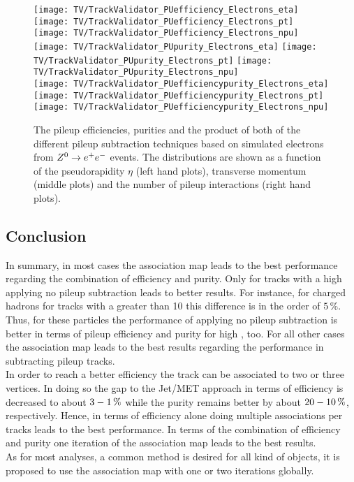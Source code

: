 \begin{figure}[Ht]
    \centering
    \texttt{[image: TV/TrackValidator\_PUefficiency\_Electrons\_eta]}
    \texttt{[image: TV/TrackValidator\_PUefficiency\_Electrons\_pt]}
    \texttt{[image: TV/TrackValidator\_PUefficiency\_Electrons\_npu]}
    \\
    \texttt{[image: TV/TrackValidator\_PUpurity\_Electrons\_eta]}
    \texttt{[image: TV/TrackValidator\_PUpurity\_Electrons\_pt]}
    \texttt{[image: TV/TrackValidator\_PUpurity\_Electrons\_npu]}
    \\
    \texttt{[image: TV/TrackValidator\_PUefficiencypurity\_Electrons\_eta]}
    \texttt{[image: TV/TrackValidator\_PUefficiencypurity\_Electrons\_pt]}
    \texttt{[image: TV/TrackValidator\_PUefficiencypurity\_Electrons\_npu]}
    \caption[Pileup efficiencies, purities and their product of the different pileup subtraction techniques based on simulated electrons from $\Zz\rightarrow\EE$ events]{The pileup efficiencies, purities and the product of both of the different pileup subtraction techniques based on simulated electrons from $\Zz\rightarrow\EE$ events. The distributions are shown as a function of the pseudorapidity $\eta$ (left hand plots), transverse momentum (middle plots) and the number of pileup interactions (right hand plots). \label{plot:TACOAElPileup}}
\end{figure}



\subsection{Conclusion \label{sec:TASEFRDAC}}

In summary, in most cases the association map leads to the best performance regarding the combination of efficiency and purity. Only for tracks with a high \pt{} applying no pileup subtraction leads to better results. For instance, for charged hadrons for tracks with a \pt{} greater than 10\GeV{} this difference is in the order of $5\,\%$. Thus, for these particles the performance of applying no pileup subtraction is better in terms of pileup efficiency and purity for high \pt{}, too. For all other cases the association map leads to the best results regarding the performance in subtracting pileup tracks. \\
In order to reach a better efficiency the track can be associated to two or three vertices. In doing so the gap to the Jet/MET approach in terms of efficiency is decreased to about $3\--1\,\%$ while the purity remains better by about $20\--10\,\%$, respectively. Hence, in terms of efficiency alone doing multiple associations per tracks leads to the best performance. In terms of the combination of efficiency and purity one iteration of the association map leads to the best results. \\
As for most analyses, a common method is desired for all kind of objects, it is proposed to use the association map with one or two iterations globally.

